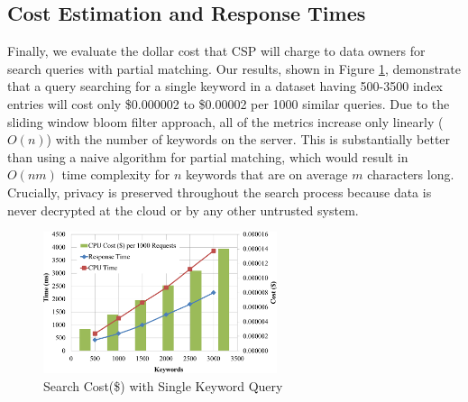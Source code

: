 \subsection{Cost Estimation and Response Times}

Finally, we evaluate the dollar cost that CSP will charge to data owners for search
queries with partial matching. 
Our results, shown in Figure \ref{fig:cost_single_query}, demonstrate that a query
searching for a single keyword in a dataset having 500-3500 index entries will cost only 
\$0.000002 to \$0.00002 per 1000 similar
queries. Due to the sliding window bloom filter approach, 
all of the metrics increase only linearly ($O(n)$) with the number
of keywords on the server. This is substantially better than using a naive algorithm 
for partial matching, which would result in $O(nm)$ time complexity 
for $n$ keywords that are on average $m$ characters long. Crucially,
privacy is preserved throughout the search process because data is never
decrypted at the cloud or by any other untrusted system.


\begin{figure}
  \centering
  \includegraphics[width=2.7in]{figures/cost_keywords_graph.png}
  \vspace{-10px}
  \caption{Search Cost(\$) with Single Keyword Query}
  \vspace{-10px}
  \label{fig:cost_single_query}
\end{figure}
